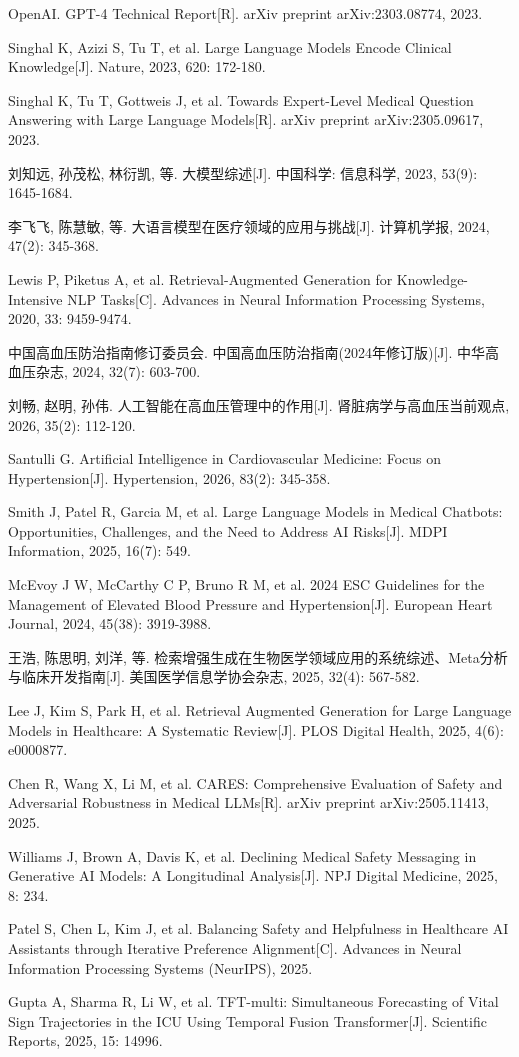 \documentclass[zihao=-4,a4paper]{ctexart}
\begin{document}
\begin{enumerate}[label={[\arabic*]}]
    \item OpenAI. GPT-4 Technical Report[R]. arXiv preprint arXiv:2303.08774, 2023.
    \item Singhal K, Azizi S, Tu T, et al. Large Language Models Encode Clinical Knowledge[J]. Nature, 2023, 620: 172-180.
    \item Singhal K, Tu T, Gottweis J, et al. Towards Expert-Level Medical Question Answering with Large Language Models[R]. arXiv preprint arXiv:2305.09617, 2023.
    \item 刘知远, 孙茂松, 林衍凯, 等. 大模型综述[J]. 中国科学: 信息科学, 2023, 53(9): 1645-1684.
    \item 李飞飞, 陈慧敏, 等. 大语言模型在医疗领域的应用与挑战[J]. 计算机学报, 2024, 47(2): 345-368.
    \item Lewis P, Piketus A, et al. Retrieval-Augmented Generation for Knowledge-Intensive NLP Tasks[C]. Advances in Neural Information Processing Systems, 2020, 33: 9459-9474.
    \item 中国高血压防治指南修订委员会. 中国高血压防治指南(2024年修订版)[J]. 中华高血压杂志, 2024, 32(7): 603-700.
    \item 刘畅, 赵明, 孙伟. 人工智能在高血压管理中的作用[J]. 肾脏病学与高血压当前观点, 2026, 35(2): 112-120.
    \item Santulli G. Artificial Intelligence in Cardiovascular Medicine: Focus on Hypertension[J]. Hypertension, 2026, 83(2): 345-358.
    \item Smith J, Patel R, Garcia M, et al. Large Language Models in Medical Chatbots: Opportunities, Challenges, and the Need to Address AI Risks[J]. MDPI Information, 2025, 16(7): 549.
    \item McEvoy J W, McCarthy C P, Bruno R M, et al. 2024 ESC Guidelines for the Management of Elevated Blood Pressure and Hypertension[J]. European Heart Journal, 2024, 45(38): 3919-3988.
    \item 王浩, 陈思明, 刘洋, 等. 检索增强生成在生物医学领域应用的系统综述、Meta分析与临床开发指南[J]. 美国医学信息学协会杂志, 2025, 32(4): 567-582.
    \item Lee J, Kim S, Park H, et al. Retrieval Augmented Generation for Large Language Models in Healthcare: A Systematic Review[J]. PLOS Digital Health, 2025, 4(6): e0000877.
    \item Chen R, Wang X, Li M, et al. CARES: Comprehensive Evaluation of Safety and Adversarial Robustness in Medical LLMs[R]. arXiv preprint arXiv:2505.11413, 2025.
    \item Williams J, Brown A, Davis K, et al. Declining Medical Safety Messaging in Generative AI Models: A Longitudinal Analysis[J]. NPJ Digital Medicine, 2025, 8: 234.
    \item Patel S, Chen L, Kim J, et al. Balancing Safety and Helpfulness in Healthcare AI Assistants through Iterative Preference Alignment[C]. Advances in Neural Information Processing Systems (NeurIPS), 2025.
    \item Gupta A, Sharma R, Li W, et al. TFT-multi: Simultaneous Forecasting of Vital Sign Trajectories in the ICU Using Temporal Fusion Transformer[J]. Scientific Reports, 2025, 15: 14996.
\end{enumerate}
\end{document}
